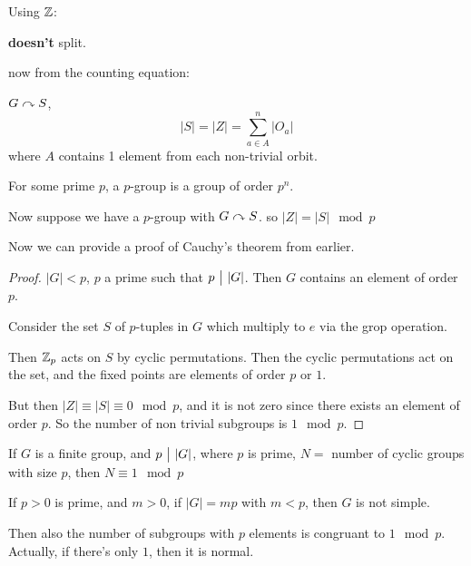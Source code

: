 \documentclass[12pt, twosided]{article}
\begin{document}
\begin{exa} Using \(\mathbb{Z}\):
  
  \begin{center}
  \end{center}
  \textbf{doesn't} split.
\end{exa}

now from the counting equation:

\(G \curvearrowright S\), \[|S| = |Z| = \sum_{a \in A}^n |O_a|\] where \(A\) contains 1 element from each non-trivial orbit.

\begin{df}
  For some prime \(p\), a \(p\)-group is a group of order \(p^n\).
\end{df}

Now suppose we have a \(p\)-group with \(G \curvearrowright S\). so \(|Z| = |S| \mod{p}\)

Now we can provide a proof of Cauchy's theorem from earlier.

\begin{proof}
  \(|G|< p\), \(p\) a prime such that \(p \ \big\vert\  |G|\). Then \(G\) contains an element of order \(p\).

  Consider the set \(S\) of \(p\)-tuples in \(G\) which multiply to \(e\) via the grop operation.

  Then \(\mathbb{Z}_p\) acts on \(S\) by cyclic permutations. Then the cyclic permutations act on the set, and the fixed points are elements of order \(p\) or \(1\).

  But then \(|Z| \equiv |S| \equiv 0 \mod{p}\), and it is not zero since there exists an element of order \(p\). So the number of non trivial subgroups is \(1 \mod{p}\).
\end{proof}

\begin{clm}[Cauchy +]
  If \(G\) is a finite group, and \(p \ \big\vert\  |G|\), where \(p\) is prime, \(N = \) number of cyclic groups with size \(p\), then \(N \equiv 1 \mod{p}\)
\end{clm}

\begin{exa}
  If \(p > 0\) is prime, and \(m > 0\), if \(|G| = mp\) with \(m < p\), then \(G\) is not simple.
\end{exa}

Then also the number of subgroups with \(p\) elements is congruant to \(1\mod{p}\). Actually, if there's only \(1\), then it is normal.
\end{document}
